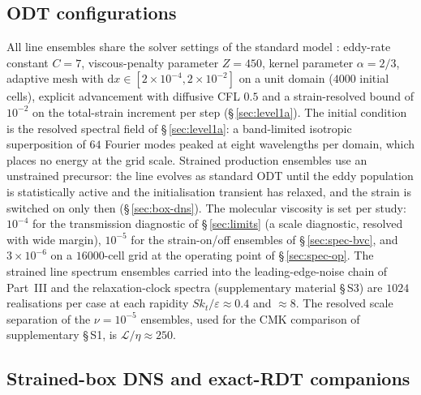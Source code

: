\documentclass[lineno]{JFM-FLM_Au}
\begin{document}
\subsection{ODT configurations}

All line ensembles share the solver settings of the standard model
\citep{StephensLignell2021}: eddy-rate constant $C=7$, viscous-penalty
parameter $Z=450$, kernel parameter $\alpha=2/3$, adaptive mesh with
$\mathrm{d}x\in[2\times10^{-4},2\times10^{-2}]$ on a unit domain
($4000$ initial cells), explicit advancement with diffusive CFL $0.5$
and a strain-resolved bound of $10^{-2}$ on the total-strain increment
per step (\S\,\ref{sec:level1a}). The initial condition is the resolved
spectral field of \S\,\ref{sec:level1a}: a band-limited isotropic
superposition of $64$ Fourier modes peaked at eight wavelengths per
domain, which places no energy at the grid scale. Strained production
ensembles use an unstrained precursor: the line evolves as standard ODT
until the eddy population is statistically active and the initialisation
transient has relaxed, and the strain is switched on only then
(\S\,\ref{sec:box-dns}). The molecular viscosity is set per study:
$10^{-4}$ for the transmission diagnostic of \S\,\ref{sec:limits}
(a scale diagnostic, resolved with wide margin), $10^{-5}$ for the
strain-on/off ensembles of \S\,\ref{sec:spec-bvc}, and
$3\times10^{-6}$ on a $16000$-cell grid at the operating point of \S\,\ref{sec:spec-op}. The strained line spectrum ensembles carried into the leading-edge-noise chain of Part~III and the relaxation-clock spectra (supplementary material \S\,S3) are $1024$ realisations per case at each rapidity $Sk_t/\varepsilon\approx0.4$ and $\approx8$. The resolved scale separation of the $\nu=10^{-5}$ ensembles, used for the CMK comparison of supplementary \S\,S1, is $\mathcal L/\eta\approx250$.

\subsection{Strained-box DNS and exact-RDT companions}
\end{document}
